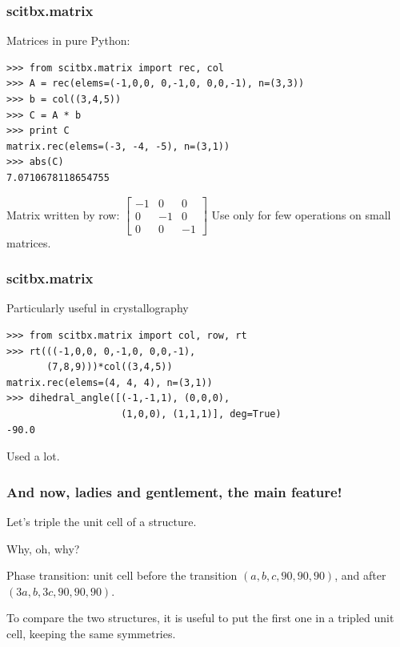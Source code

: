 \documentclass[10pt]{beamer}
\begin{document}
\begin{frame}[fragile]
\frametitle{scitbx.matrix}
Matrices in pure Python:
\begin{verbatim}
>>> from scitbx.matrix import rec, col
>>> A = rec(elems=(-1,0,0, 0,-1,0, 0,0,-1), n=(3,3))
>>> b = col((3,4,5))
>>> C = A * b
>>> print C
matrix.rec(elems=(-3, -4, -5), n=(3,1))
>>> abs(C)
7.0710678118654755
\end{verbatim}
Matrix written by row: $\begin{bmatrix} -1 & 0 & 0 \\ 0 & -1 & 0 \\ 0 & 0 & -1 \end{bmatrix}$
Use only for few operations on small matrices.
\end{frame}

\begin{frame}[fragile]
\frametitle{scitbx.matrix}
Particularly useful in crystallography
\begin{verbatim}
>>> from scitbx.matrix import col, row, rt
>>> rt(((-1,0,0, 0,-1,0, 0,0,-1),
       (7,8,9)))*col((3,4,5))
matrix.rec(elems=(4, 4, 4), n=(3,1))
>>> dihedral_angle([(-1,-1,1), (0,0,0), 
                    (1,0,0), (1,1,1)], deg=True)
-90.0
\end{verbatim}
Used a lot.
\end{frame}

\begin{frame}[fragile]
\frametitle{And now, ladies and gentlement, the main feature!}

Let's triple the unit cell of a structure.

Why, oh, why?

Phase transition: unit cell before the transition $(a, b, c, 90, 90, 90)$, and after $(3a, b, 3c, 90, 90, 90)$.

To compare the two structures, it is useful to put the first one in a tripled unit cell, keeping the same symmetries.


\end{frame}
\end{document}
